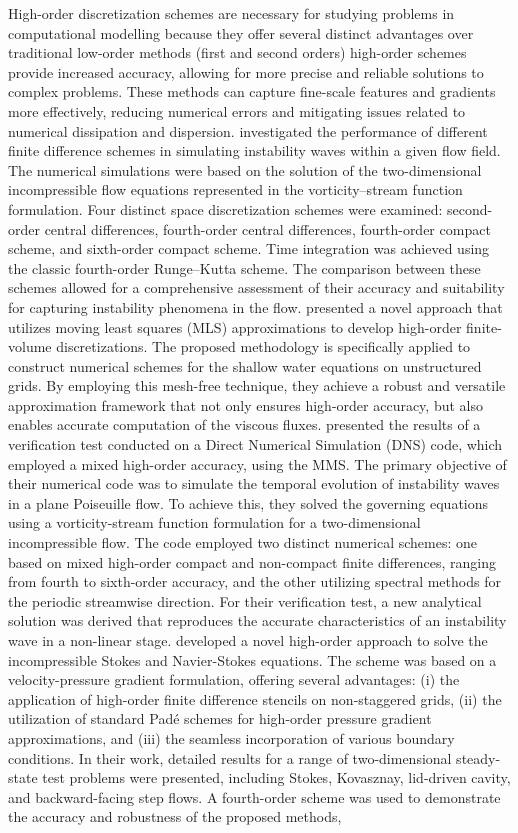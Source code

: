 \documentclass[preprint, 12pt]{elsarticle}
\begin{document}
High-order discretization schemes are necessary for studying problems in computational modelling because they offer several distinct advantages over traditional low-order methods (first and second orders) high-order schemes provide increased accuracy, allowing for more precise and reliable solutions to complex problems. These methods can capture fine-scale features and gradients more effectively, reducing numerical errors and mitigating issues related to numerical dissipation and dispersion. \citet{Souza2005} investigated the performance of different finite difference schemes in simulating instability waves within a given flow field. The numerical simulations were based on the solution of the two-dimensional incompressible flow equations represented in the vorticity–stream function formulation. Four distinct space discretization schemes were examined: second-order central differences, fourth-order central differences, fourth-order compact scheme, and sixth-order compact scheme. Time integration was achieved using the classic fourth-order Runge–Kutta scheme. The comparison between these schemes allowed for a comprehensive assessment of their accuracy and suitability for capturing instability phenomena in the flow. \citet{Cueto2006} presented a novel approach that utilizes moving least squares (MLS) approximations to develop high-order finite-volume discretizations. The proposed methodology is specifically applied to construct numerical schemes for the shallow water equations on unstructured grids. By employing this mesh-free technique, they achieve a robust and versatile approximation framework that not only ensures high-order accuracy, but also enables accurate computation of the viscous fluxes. \citet{Silva2010} presented the results of a verification test conducted on a Direct Numerical Simulation (DNS) code, which employed a mixed high-order accuracy, using the MMS. The primary objective of their numerical code was to simulate the temporal evolution of instability waves in a plane Poiseuille flow. To achieve this, they solved the governing equations using a vorticity-stream function formulation for a two-dimensional incompressible flow. The code employed two distinct numerical schemes: one based on mixed high-order compact and non-compact finite differences, ranging from fourth to sixth-order accuracy, and the other utilizing spectral methods for the periodic streamwise direction. For their verification test, a new analytical solution was derived that reproduces the accurate characteristics of an instability wave in a non-linear stage. \citet{Fadel2011} developed a novel high-order approach to solve the incompressible Stokes and Navier-Stokes equations. The scheme was based on a velocity-pressure gradient formulation, offering several advantages: (i) the application of high-order finite difference stencils on non-staggered grids, (ii) the utilization of standard Padé schemes for high-order pressure gradient approximations, and (iii) the seamless incorporation of various boundary conditions. In their work, detailed results for a range of two-dimensional steady-state test problems were presented, including Stokes, Kovasznay, lid-driven cavity, and backward-facing step flows. A fourth-order scheme was used to demonstrate the accuracy and robustness of the proposed methods, 
\end{document}
